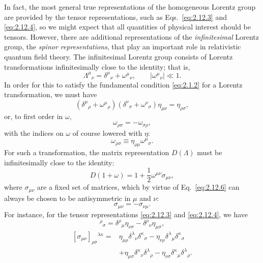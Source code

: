 In fact, the most general true representations of the homogeneous Lorentz
group are provided by the tensor representations, such as
Eqs.~\eqref{eq:2.12.3} and \eqref{eq:2.12.4}, so we might expect that all
quantities of physical interest should be tensors. However, there are additional
representations of the \emph{infinitesimal} Lorentz group, the \emph{spinor
representations}, that play an important role in relativistic quantum field
theory. The infinitesimal Lorentz group consists of Lorentz transformations
infinitesimally close to the identity; that is,
\begin{equation}
  \Lambda^\mu{}_\nu=\delta^\mu{}_\nu+\omega^\mu{}_\nu,
  \qquad \lvert\omega^\mu{}_\nu\rvert\ll1 .
  \tag{2.12.5}\label{eq:2.12.5}
\end{equation}
In order for this to satisfy the fundamental condition \eqref{eq:2.1.2} for a
Lorentz transformation, we must have
\[
  (\delta^\mu{}_\rho+\omega^\mu{}_\rho)
  (\delta^\nu{}_\sigma+\omega^\nu{}_\sigma)\eta_{\mu\nu}
  =\eta_{\rho\sigma},
\]
or, to first order in \(\omega\),
\begin{equation}
  \omega_{\rho\sigma}=-\omega_{\sigma\rho},
  \tag{2.12.6}\label{eq:2.12.6}
\end{equation}
with the indices on \(\omega\) of course lowered with \(\eta\):
\[
  \omega_{\rho\sigma}\equiv\eta_{\rho\mu}\omega^\mu{}_\sigma .
\]
For such a transformation, the matrix representation \(D(\Lambda)\) must be
infinitesimally close to the identity:
\begin{equation}
  D(1+\omega)=1+\frac12\omega^{\mu\nu}\sigma_{\mu\nu},
  \tag{2.12.7}\label{eq:2.12.7}
\end{equation}
where \(\sigma_{\mu\nu}\) are a fixed set of matrices, which by virtue of
Eq.~\eqref{eq:2.12.6} can always be chosen to be antisymmetric in \(\mu\)
and \(\nu\):
\begin{equation}
  \sigma_{\mu\nu}=-\sigma_{\nu\mu}.
  \tag{2.12.8}\label{eq:2.12.8}
\end{equation}
For instance, for the tensor representations \eqref{eq:2.12.3} and
\eqref{eq:2.12.4}, we have
\begin{equation}
  [\sigma_{\mu\nu}]^\rho{}_\sigma
  =\delta^\rho{}_\mu\eta_{\nu\sigma}
   -\delta^\rho{}_\nu\eta_{\mu\sigma},
  \tag{2.12.9}\label{eq:2.12.9}
\end{equation}
\begin{equation}
\begin{aligned}
  [\sigma_{\mu\nu}]_{\rho\sigma}{}^{\lambda\kappa}
  ={}&\eta_{\mu\rho}\delta^\lambda{}_\nu\delta^\kappa{}_\sigma
     -\eta_{\nu\rho}\delta^\lambda{}_\mu\delta^\kappa{}_\sigma\\
    &+\eta_{\mu\sigma}\delta^\kappa{}_\nu\delta^\lambda{}_\rho
     -\eta_{\nu\sigma}\delta^\kappa{}_\mu\delta^\lambda{}_\rho .
\end{aligned}
  \tag{2.12.10}\label{eq:2.12.10}
\end{equation}
